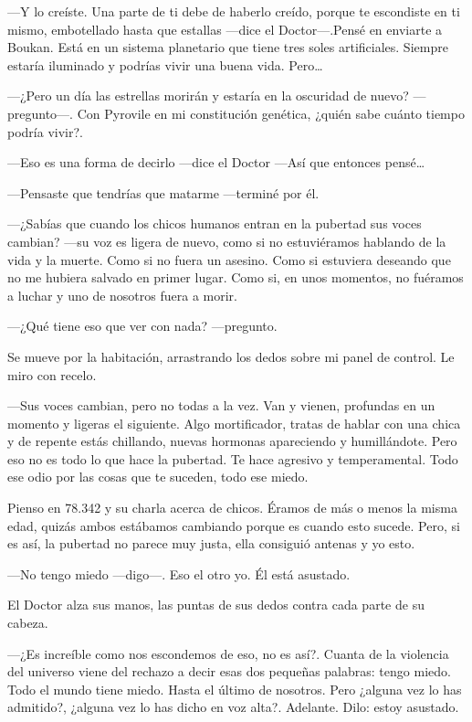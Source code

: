 ---Y lo creíste. Una parte de ti debe de haberlo creído, porque te
escondiste en ti mismo, embotellado hasta que estallas ---dice el
Doctor---.Pensé en enviarte a Boukan. Está en un sistema planetario que
tiene tres soles artificiales. Siempre estaría iluminado y podrías vivir
una buena vida. Pero\ldots{}

---¿Pero un día las estrellas morirán y estaría en la oscuridad de
nuevo? ---pregunto---. Con Pyrovile en mi constitución genética, ¿quién
sabe cuánto tiempo podría vivir?.

---Eso es una forma de decirlo ---dice el Doctor ---Así que entonces
pensé\ldots{}

---Pensaste que tendrías que matarme ---terminé por él.

---¿Sabías que cuando los chicos humanos entran en la pubertad sus voces
cambian? ---su voz es ligera de nuevo, como si no estuviéramos hablando
de la vida y la muerte. Como si no fuera un asesino. Como si estuviera
deseando que no me hubiera salvado en primer lugar. Como si, en unos
momentos, no fuéramos a luchar y uno de nosotros fuera a morir.

---¿Qué tiene eso que ver con nada? ---pregunto.

Se mueve por la habitación, arrastrando los dedos sobre mi panel de
control. Le miro con recelo.

---Sus voces cambian, pero no todas a la vez. Van y vienen, profundas en
un momento y ligeras el siguiente. Algo mortificador, tratas de hablar
con una chica y de repente estás chillando, nuevas hormonas apareciendo
y humillándote. Pero eso no es todo lo que hace la pubertad. Te hace
agresivo y temperamental. Todo ese odio por las cosas que te suceden,
todo ese miedo.

Pienso en 78.342 y su charla acerca de chicos. Éramos de más o menos la
misma edad, quizás ambos estábamos cambiando porque es cuando esto
sucede. Pero, si es así, la pubertad no parece muy justa, ella consiguió
antenas y yo esto.

---No tengo miedo ---digo---. Eso el otro yo. Él está asustado.

El Doctor alza sus manos, las puntas de sus dedos contra cada parte de
su cabeza.

---¿Es increíble como nos escondemos de eso, no es así?. Cuanta de la
violencia del universo viene del rechazo a decir esas dos pequeñas
palabras: tengo miedo. Todo el mundo tiene miedo. Hasta el último de
nosotros. Pero ¿alguna vez lo has admitido?, ¿alguna vez lo has dicho en
voz alta?. Adelante. Dilo: estoy asustado.

